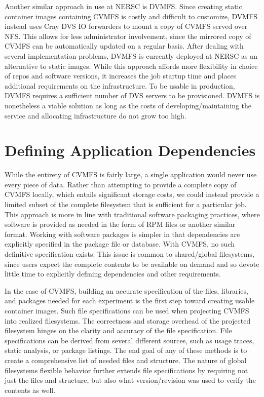 \documentclass[sigconf]{acmart}
\begin{document}
Another similar approach in use at NERSC is DVMFS.
Since creating static container images containing CVMFS is costly and difficult to customize,
DVMFS instead uses Cray DVS IO forwarders to mount a copy of CVMFS served over NFS.
This allows for less administrator involvement,
since the mirrored copy of CVMFS can be automatically updated on a regular basis.
After dealing with several implementation problems,
DVMFS is currently deployed at NERSC as an alternative to static images.
While this approach affords more flexibility in choice of repos and software versions,
it increases the job startup time and places additional requirements on the infrastructure.
To be usable in production, DVMFS requires a sufficient number of DVS servers to be provisioned.
DVMFS is nonetheless a viable solution as long as the costs of developing/maintaining the service and allocating infrastructure do not grow too high.

\section{Defining Application Dependencies}

While the entirety of CVMFS is fairly large,
a single application would never use every piece of data.
Rather than attempting to provide a complete copy of CVMFS locally,
which entails significant storage costs,
we could instead provide a limited subset of the complete filesystem that is sufficient for a particular job.
This approach is more in line with traditional software packaging practices,
where software is provided as needed in the form of RPM files or another similar format.
Working with software packages is simpler in that dependencies are explicitly specified in the package file or database.
With CVMFS, no such definitive specification exists.
This issue is common to shared/global filesystems,
since users expect the complete contents to be available on demand and so devote little time to explicitly defining dependencies and other requirements.

In the case of CVMFS,
building an accurate 
specification of the files, libraries, and packages
needed for each experiment is the first step toward creating usable container images.
Such file specifications can be used when 
projecting CVMFS into realized filesystems.
The correctness and storage overhead of the projected filesystem hinges on the clarity and accuracy of the file specification.
File specifications can be derived from several
different sources, such as 
usage traces, static analysis, or package listings.
The end goal of any of these methods is to 
create a comprehensive list of needed files and structure.
The nature of global filesystems flexible behavior
further extends file specifications by requiring
not just the files and structure, but also what
version/revision was used to verify the contents as well.
\end{document}
